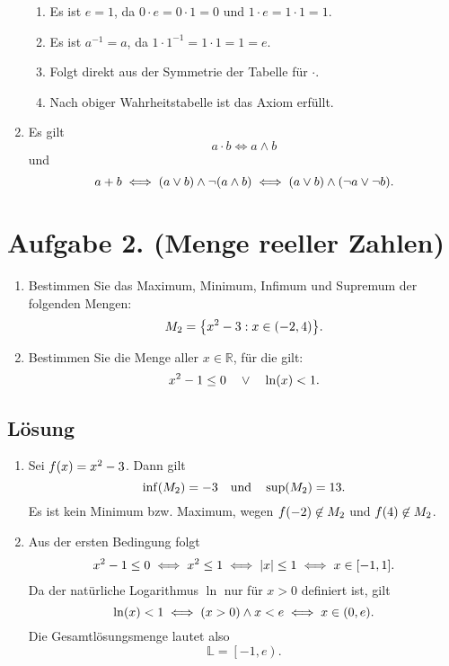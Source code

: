 \documentclass[german,12pt]{homework}
\newcommand{\RR}{\mathbb{R}}
\newcommand{\LL}{\mathbb{L}}
\DeclarePairedDelimiter{\absolute}{\lvert}{\rvert}
\DeclarePairedDelimiter{\enbrace}{(}{)}
\DeclarePairedDelimiter{\benbrace}{[}{]}
\DeclarePairedDelimiter{\penbrace}{\{}{\}}
\begin{document}
\begin{enumerate}
\begin{enumerate}[label=(A\arabic*)]
            \item Es ist \(e = 1\), da \(0 \cdot e = 0 \cdot 1 = 0\) und \(1 \cdot e = 1 \cdot 1 = 1\).
            \item Es ist \(a^{-1} = a\), da \(1 \cdot 1^{-1} = 1 \cdot 1 = 1 = e\).
            \item Folgt direkt aus der Symmetrie der Tabelle für \(\cdot\).
            \item Nach obiger Wahrheitstabelle ist das Axiom erfüllt.
        \end{enumerate}
        \item Es gilt
        \[a \cdot b \iff a \land b\]
        und
        \[a + b \iff \enbrace*{a \lor b} \land \lnot\enbrace*{a \land b} \iff \enbrace*{a \lor b} \land \enbrace*{\lnot{a} \lor \lnot{b}}.\]
    \end{enumerate}

    \section*{Aufgabe 2. (Menge reeller Zahlen)}

    \begin{problem}
        \begin{enumerate}
            \item Bestimmen Sie das Maximum, Minimum, Infimum und Supremum der folgenden Mengen:
            \[M_2 = \penbrace*{x^2 - 3 : x \in \enbrace*{-2, 4}}.\]
            \item Bestimmen Sie die Menge aller \(x \in \RR\), für die gilt:
            \[x^2 - 1 \le 0 \quad \lor \quad \ln\enbrace*{x} < 1.\]
        \end{enumerate}
    \end{problem}

    \subsection*{Lösung}
    \begin{enumerate}
        \item Sei \(f\enbrace*{x} = x^2 - 3\). Dann gilt
        \[\inf\enbrace*{M_2} = -3 \quad \text{und} \quad \sup\enbrace*{M_2} = 13.\]
        Es ist kein Minimum bzw. Maximum, wegen \(f\enbrace*{-2} \not\in M_2\) und \(f\enbrace*{4} \not\in M_2\).
        \item Aus der ersten Bedingung folgt
        \begin{align*}
            x^2 - 1 \le 0 \iff x^2 \le 1 \iff \absolute*{x} \le 1 \iff x \in \benbrace*{-1, 1}.
        \end{align*}
        Da der natürliche Logarithmus \(\ln\) nur für \(x > 0\) definiert ist, gilt
        \[\ln\enbrace*{x} < 1 \iff \enbrace*{x > 0} \land x < e \iff x \in \enbrace*{0, e}.\]
        Die Gesamtlösungsmenge lautet also
        \[\LL = \left[-1, e\right).\]
    \end{enumerate}
\end{document}
